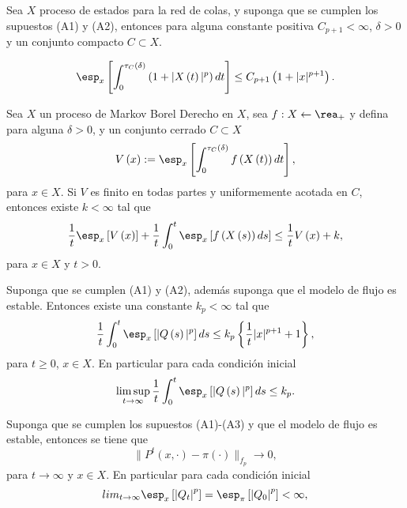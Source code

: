 \begin{Prop}\label{Prop.5.3.DaiSean}
Sea $X$ proceso de estados para la red de colas, y suponga que se
cumplen los supuestos (A1) y (A2), entonces para alguna constante
positiva $C_{p+1}<\infty$, $\delta>0$ y un conjunto compacto
$C\subset X$.

\begin{equation}\label{Eq.5.4}
\esp_{x}\left[\int_{0}^{\tau_{C}\left(\delta\right)}\left(1+|X\left(t\right)|^{p}\right)dt\right]\leq
C_{p+1}\left(1+|x|^{p+1}\right).
\end{equation}
\end{Prop}

\begin{Prop}\label{Prop.5.4.DaiSean}
Sea $X$ un proceso de Markov Borel Derecho en $X$, sea
$f:X\leftarrow\rea_{+}$ y defina para alguna $\delta>0$, y un
conjunto cerrado $C\subset X$
\[V\left(x\right):=\esp_{x}\left[\int_{0}^{\tau_{C}\left(\delta\right)}f\left(X\left(t\right)\right)dt\right],\]
para $x\in X$. Si $V$ es finito en todas partes y uniformemente
acotada en $C$, entonces existe $k<\infty$ tal que
\begin{equation}\label{Eq.5.11}
\frac{1}{t}\esp_{x}\left[V\left(x\right)\right]+\frac{1}{t}\int_{0}^{t}\esp_{x}\left[f\left(X\left(s\right)\right)ds\right]\leq\frac{1}{t}V\left(x\right)+k,
\end{equation}
para $x\in X$ y $t>0$.
\end{Prop}


\begin{Teo}
Suponga que se cumplen (A1) y (A2), adem\'as suponga que el modelo
de flujo es estable. Entonces existe una constante $k_{p}<\infty$
tal que
\begin{equation}\label{Eq.5.13}
\frac{1}{t}\int_{0}^{t}\esp_{x}\left[|Q\left(s\right)|^{p}\right]ds\leq
k_{p}\left\{\frac{1}{t}|x|^{p+1}+1\right\},
\end{equation}
para $t\geq0$, $x\in X$. En particular para cada condici\'on
inicial
\begin{equation}\label{Eq.5.14}
\limsup_{t\rightarrow\infty}\frac{1}{t}\int_{0}^{t}\esp_{x}\left[|Q\left(s\right)|^{p}\right]ds\leq
k_{p}.
\end{equation}
\end{Teo}

\begin{Teo}\label{Tma.6.2}
Suponga que se cumplen los supuestos (A1)-(A3) y que el modelo de
flujo es estable, entonces se tiene que
\[\parallel P^{t}\left(x,\cdot\right)-\pi\left(\cdot\right)\parallel_{f_{p}}\rightarrow0,\]
para $t\rightarrow\infty$ y $x\in X$. En particular para cada
condici\'on inicial
\[lim_{t\rightarrow\infty}\esp_{x}\left[\left|Q_{t}\right|^{p}\right]=\esp_{\pi}\left[\left|Q_{0}\right|^{p}\right]<\infty,\]
\end{Teo}

